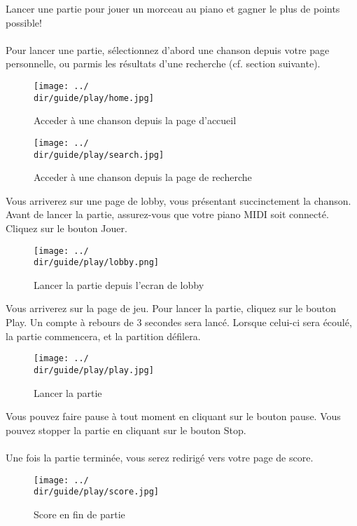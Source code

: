 Lancer une partie pour jouer un morceau au piano et gagner le plus de points possible!
\\\\
Pour lancer une partie, sélectionnez d’abord une chanson depuis votre page personnelle, ou parmis les résultats d’une recherche (cf. section suivante).

\begin{figure}[H]
	\texttt{[image: ../\\dir/guide/play/home.jpg]}
	\caption{Acceder à une chanson depuis la page d'accueil}
\end{figure}

\begin{figure}[H]
	\texttt{[image: ../\\dir/guide/play/search.jpg]}
	\caption{Acceder à une chanson depuis la page de recherche}
\end{figure}

Vous arriverez sur une page de lobby, vous présentant succinctement la chanson.
Avant de lancer la partie, assurez-vous que votre piano MIDI soit connecté.
Cliquez sur le bouton Jouer.

\begin{figure}[H]
	\texttt{[image: ../\\dir/guide/play/lobby.png]}
	\caption{Lancer la partie depuis l'ecran de lobby}
\end{figure}

Vous arriverez sur la page de jeu. Pour lancer la partie, cliquez sur le bouton Play. Un compte à rebours de 3 secondes sera lancé. Lorsque celui-ci sera écoulé, la partie commencera, et la partition défilera.

\begin{figure}[H]
	\texttt{[image: ../\\dir/guide/play/play.jpg]}
	\caption{Lancer la partie}
\end{figure}

Vous pouvez faire pause à tout moment en cliquant sur le bouton pause. Vous pouvez stopper la partie en cliquant sur le bouton Stop.
\\\\
Une fois la partie terminée, vous serez redirigé vers votre page de score.

\begin{figure}[H]
	\texttt{[image: ../\\dir/guide/play/score.jpg]}
	\caption{Score en fin de partie}
\end{figure}